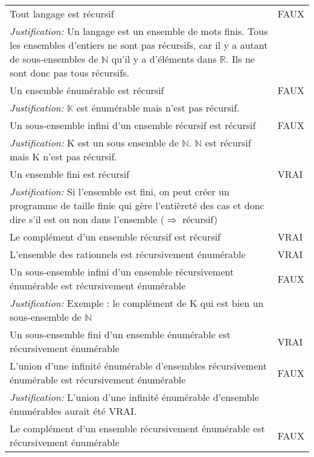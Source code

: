 \begin{longtable}{p{13cm}|l} 
    Tout langage est récursif & FAUX \\
    \textit{Justification:} Un langage est un ensemble de mots finis. Tous les ensembles d'entiers ne sont pas récursifs, car il y a autant de sous-ensembles de $\mathbb{N}$ qu'il y a d'éléments dans $\mathbb{R}$. Ils ne sont donc pas tous récursifs. & \\
    \hline
    Un ensemble énumérable est récursif & FAUX \\
    \textit{Justification:} $\mathbb{K}$ est énumérable mais n'est pas récursif. \\
    \hline
    Un sous-ensemble infini d'un ensemble récursif est récursif & FAUX \\
    \textit{Justification:} K est un sous ensemble de $\mathbb{N}$. $\mathbb{N}$ est récursif mais K n'est pas récursif. \\
    \hline
    Un ensemble fini est récursif & VRAI \\
    \textit{Justification:} Si l'ensemble est fini, on peut créer un programme de taille finie qui gère l'entièreté des cas et donc dire s'il est ou non dans l'ensemble ($\Rightarrow$ récursif) & \\
    \hline
    Le complément d'un ensemble récursif est récursif & VRAI \\
    \hline
    L'ensemble des rationnels est récursivement énumérable & VRAI \\
    \hline
    Un sous-ensemble infini d'un ensemble récursivement énumérable est récursivement énumérable & FAUX \\
    \textit{Justification:} Exemple : le complément de K qui est bien un sous-ensemble de $\mathbb{N}$ & \\
    \hline
    Un sous-ensemble fini d'un ensemble énumérable est récursivement énumérable & VRAI \\
    \hline
    L'union d'une infinité énumérable d'ensembles récursivement énumérable est récursivement énumérable & FAUX \\
    \textit{Justification:} L'union d'une infinité énumérable d'ensemble énumérables aurait été VRAI. \\
    \hline
    Le complément d'un ensemble récursivement énumérable est récursivement énumérable & FAUX \\

\end{longtable}
